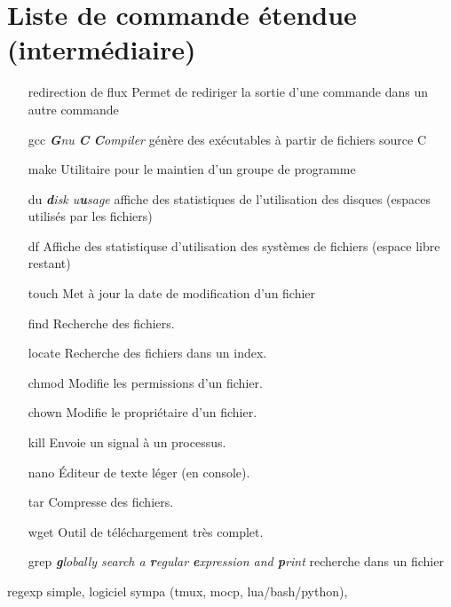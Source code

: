 \documentclass[french, a4paper, 12pt, titlepage]{article}
\begin{document}







\newpage

\section{Liste de commande étendue (intermédiaire)}
\begin{enumerate}
\item[redirection de flux] Permet de rediriger la sortie d'une commande dans un autre commande
\item[gcc] \emph{\textbf{G}nu \textbf{C} \textbf{C}ompiler}  génère des exécutables à partir de fichiers source C
\item[make] Utilitaire pour le maintien d'un groupe de programme
\item[du] \emph{\textbf{d}isk u\textbf{u}sage} affiche des statistiques de l'utilisation des disques (espaces utilisés par les fichiers)
\item[df] Affiche des statistiquse d'utilisation des systèmes de fichiers (espace libre restant)
\item[touch] Met à jour la date de modification d'un fichier
\item[find] Recherche des fichiers.
\item[locate] Recherche des fichiers dans un index.
\item[chmod] Modifie les permissions d'un fichier.
\item[chown] Modifie le propriétaire d'un fichier.
\item[kill] Envoie un signal à un processus.
\item[nano] Éditeur de texte léger (en console).
\item[tar] Compresse des fichiers.
\item[wget] Outil de téléchargement très complet.
\item[grep] \emph{\textbf{g}lobally search a \textbf{r}egular \textbf{e}xpression and \textbf{p}rint} recherche dans un fichier
\end{enumerate}
regexp simple, logiciel sympa (tmux, mocp, lua/bash/python),















\newpage
\end{document}
